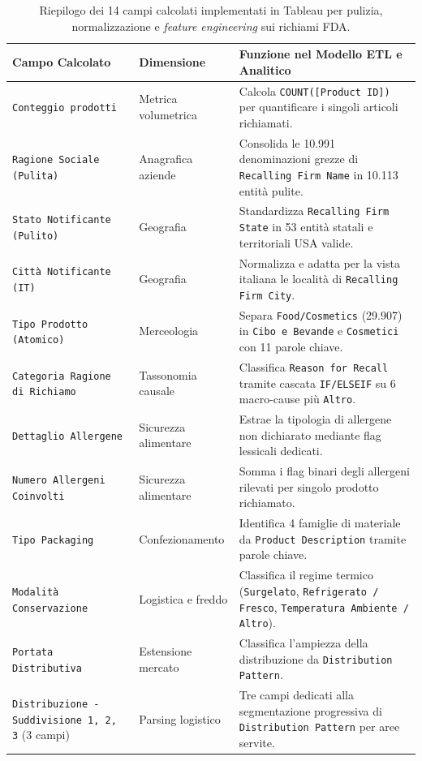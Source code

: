\begin{table}[htbp]
\centering
\caption{Riepilogo dei 14 campi calcolati implementati in Tableau per pulizia, normalizzazione e \textit{feature engineering} sui richiami FDA.}
\label{tab:calculated_fields}
\small
\setlength{\tabcolsep}{4.5pt}
\begin{tabularx}{\textwidth}{@{}>{\raggedright\arraybackslash}p{4.6cm}>{\raggedright\arraybackslash}p{2.7cm}>{\raggedright\arraybackslash}X@{}}
\toprule
\textbf{Campo Calcolato} & \textbf{Dimensione} & \textbf{Funzione nel Modello ETL e Analitico} \\
\midrule
\texttt{Conteggio prodotti} & Metrica volumetrica & Calcola \texttt{COUNT([Product ID])} per quantificare i singoli articoli richiamati. \\
\texttt{Ragione Sociale (Pulita)} & Anagrafica aziende & Consolida le 10.991 denominazioni grezze di \texttt{Recalling Firm Name} in 10.113 entità pulite. \\
\texttt{Stato Notificante (Pulito)} & Geografia & Standardizza \texttt{Recalling Firm State} in 53 entità statali e territoriali USA valide. \\
\texttt{Città Notificante (IT)} & Geografia & Normalizza e adatta per la vista italiana le località di \texttt{Recalling Firm City}. \\
\texttt{Tipo Prodotto (Atomico)} & Merceologia & Separa \texttt{Food/Cosmetics} (29.907) in \texttt{Cibo e Bevande} e \texttt{Cosmetici} con 11 parole chiave. \\
\texttt{Categoria Ragione di Richiamo} & Tassonomia causale & Classifica \texttt{Reason for Recall} tramite cascata \texttt{IF/ELSEIF} su 6 macro-cause più \texttt{Altro}. \\
\texttt{Dettaglio Allergene} & Sicurezza alimentare & Estrae la tipologia di allergene non dichiarato mediante flag lessicali dedicati. \\
\texttt{Numero Allergeni Coinvolti} & Sicurezza alimentare & Somma i flag binari degli allergeni rilevati per singolo prodotto richiamato. \\
\texttt{Tipo Packaging} & Confezionamento & Identifica 4 famiglie di materiale da \texttt{Product Description} tramite parole chiave. \\
\texttt{Modalità Conservazione} & Logistica e freddo & Classifica il regime termico (\texttt{Surgelato}, \texttt{Refrigerato / Fresco}, \texttt{Temperatura Ambiente / Altro}). \\
\texttt{Portata Distributiva} & Estensione mercato & Classifica l'ampiezza della distribuzione da \texttt{Distribution Pattern}. \\
\texttt{Distribuzione - Suddivisione 1, 2, 3} (3 campi) & Parsing logistico & Tre campi dedicati alla segmentazione progressiva di \texttt{Distribution Pattern} per aree servite. \\
\bottomrule
\end{tabularx}
\end{table}

